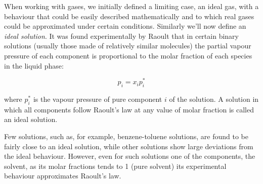\documentclass[12pt,a4paper]{report}
\newif\ifstudents
\begin{document}
   When working with gases, we initially defined a limiting case, an ideal gas, with a behaviour that could be easily described mathematically and to which real gases could be approximated under certain conditions. Similarly we'll now define an \textit{ideal solution}.
   It was found experimentally by Raoult that in certain binary solutions (usually those made of relatively similar molecules) the partial vapour pressure of each component is proportional to the molar fraction of each species in the liquid phase:
   \ifstudents \hideit[2]{ \fi
   \begin{equation*}
   p_{i}=x_{i}p^{*}_{i}
   \end{equation*}
   \ifstudents } \fi
   where $p^{*}_{i}$ is the vapour pressure of pure component $i$ of the solution. A solution in which all components follow Raoult's law at any value of molar fraction is called an ideal solution.
   \ifstudents \hideit[2]{ \fi
   \begin{center}
   \end{center}
   \ifstudents } \fi
   Few solutions, such as, for example, benzene-toluene solutions, are found to be fairly close to an ideal solution, while other solutions show large deviations from the ideal behaviour. However, even for such solutions one of the components, the solvent, as its molar fractions tends to 1 (pure solvent) its experimental behaviour approximates Raoult's law.
   
\end{document}
